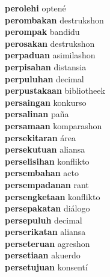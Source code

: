 \textbf{perolehi } optené \\
\textbf{perombakan } destrukshon \\
\textbf{perompak } bandidu \\
\textbf{perosakan } destrukshon \\
\textbf{perpaduan } asimilashon \\
\textbf{perpisahan } distansia \\
\textbf{perpuluhan } decimal \\
\textbf{perpustakaan } bibliotheek \\
\textbf{persaingan } konkurso \\
\textbf{persalinan } paña \\
\textbf{persamaan } komparashon \\
\textbf{persekitaran } área \\
\textbf{persekutuan } aliansa \\
\textbf{perselisihan } konflikto \\
\textbf{persembahan } acto \\
\textbf{persempadanan } rant \\
\textbf{persengketaan } konflikto \\
\textbf{persepakatan } diálogo \\
\textbf{persepuluh } decimal \\
\textbf{perserikatan } aliansa \\
\textbf{perseteruan } agreshon \\
\textbf{persetiaan } akuerdo \\
\textbf{persetujuan } konsentí \\
